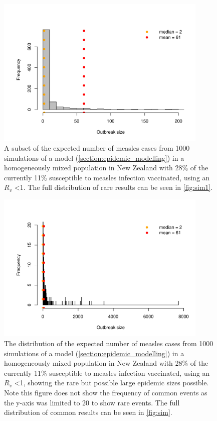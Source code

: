 \documentclass{article}
\begin{document}
\begin{figure}
     \centering
     \includegraphics[width=0.9\textwidth]{sim.pdf}
     \caption{A subset of the expected number of measles cases from 1000 simulations of a model (\autoref{section:epidemic_modelling}) in a homogeneously mixed population in New Zealand with 28\% of the currently 11\% susceptible to measles infection vaccinated, using an $R_v$ <1. The full distribution of rare results can be seen in \autoref{fig:sim1}.}
     \label{fig:sim}
\end{figure}

\begin{figure}
     \centering
     \includegraphics[width=0.9\textwidth]{sim1.pdf}
  \caption{The distribution of the expected number of measles cases from 1000 simulations of a model (\autoref{section:epidemic_modelling}) in a homogeneously mixed population in New Zealand with 28\% of the currently 11\% susceptible to measles infection vaccinated, using an $R_v$ <1, showing the rare but possible large epidemic sizes possible. 
  Note this figure does not show the frequency of common events as the y-axis was limited to 20 to show rare events. The full distribution of common results can be seen in \autoref{fig:sim}.}
     \label{fig:sim1}
\end{figure}
\end{document}
